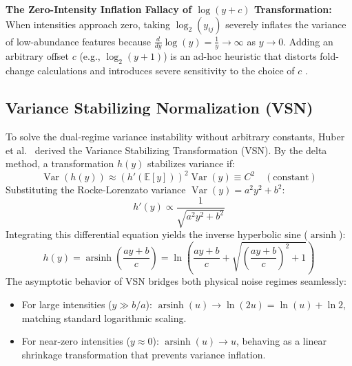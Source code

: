 \documentclass[11pt,oneside]{book}
\begin{document}
\begin{pitfallbox}
\textbf{The Zero-Intensity Inflation Fallacy of $\log(y + c)$ Transformation:}\\
When intensities approach zero, taking $\log_2(y_{ij})$ severely inflates the variance of low-abundance features because $\frac{d}{dy}\log(y) = \frac{1}{y} \to \infty$ as $y \to 0$. Adding an arbitrary offset $c$ (e.g., $\log_2(y + 1)$) is an ad-hoc heuristic that distorts fold-change calculations and introduces severe sensitivity to the choice of $c$ \cite{karpievitch2012normalization}.
\end{pitfallbox}

\subsection{Variance Stabilizing Normalization (VSN)}

To solve the dual-regime variance instability without arbitrary constants, Huber et al.~\cite{huber2002variance} derived the Variance Stabilizing Transformation (VSN). By the delta method, a transformation $h(y)$ stabilizes variance if:
\begin{equation}
\operatorname{Var}(h(y)) \approx \left( h'(\mathbb{E}[y]) \right)^2 \operatorname{Var}(y) \equiv C^2 \quad (\text{constant})
\end{equation}
Substituting the Rocke-Lorenzato variance $\operatorname{Var}(y) = a^2 y^2 + b^2$:
\begin{equation}
h'(y) \propto \frac{1}{\sqrt{a^2 y^2 + b^2}}
\end{equation}
Integrating this differential equation yields the inverse hyperbolic sine ($\operatorname{arsinh}$):
\begin{equation}
\label{eq:vsn_arsinh}
h(y) = \operatorname{arsinh}\left( \frac{a y + b}{c} \right) = \ln\left( \frac{a y + b}{c} + \sqrt{\left(\frac{a y + b}{c}\right)^2 + 1} \right)
\end{equation}
The asymptotic behavior of VSN bridges both physical noise regimes seamlessly:
\begin{itemize}
    \item For large intensities ($y \gg b/a$): $\operatorname{arsinh}(u) \to \ln(2u) = \ln(u) + \ln 2$, matching standard logarithmic scaling.
    \item For near-zero intensities ($y \approx 0$): $\operatorname{arsinh}(u) \to u$, behaving as a linear shrinkage transformation that prevents variance inflation.
\end{itemize}
\end{document}
